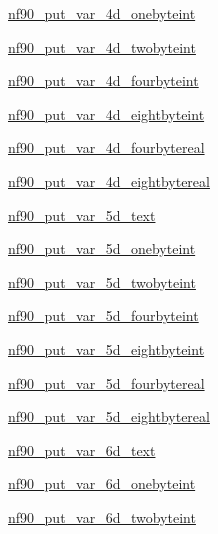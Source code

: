 \begin{DoxyCompactItemize}
\item 
\hyperlink{interfacenf90__put__var_afef8b619560b0aeb3b678a9d251a52c8}{nf90\+\_\+put\+\_\+var\+\_\+4d\+\_\+onebyteint}
\item 
\hyperlink{interfacenf90__put__var_ac772502ffbe8fab1bfe007d11a830746}{nf90\+\_\+put\+\_\+var\+\_\+4d\+\_\+twobyteint}
\item 
\hyperlink{interfacenf90__put__var_aac9f33a2d67a4df5e1e4a909ddd499b8}{nf90\+\_\+put\+\_\+var\+\_\+4d\+\_\+fourbyteint}
\item 
\hyperlink{interfacenf90__put__var_ae6f024d633a1bd897e52e8ebe5a22cc8}{nf90\+\_\+put\+\_\+var\+\_\+4d\+\_\+eightbyteint}
\item 
\hyperlink{interfacenf90__put__var_a6527c4495640fe498d397936c8f475e1}{nf90\+\_\+put\+\_\+var\+\_\+4d\+\_\+fourbytereal}
\item 
\hyperlink{interfacenf90__put__var_a1720fee6ed56ced0f889e96b69acccc9}{nf90\+\_\+put\+\_\+var\+\_\+4d\+\_\+eightbytereal}
\item 
\hyperlink{interfacenf90__put__var_a74c7bfd3ee53a05a63e210bb318f2dd1}{nf90\+\_\+put\+\_\+var\+\_\+5d\+\_\+text}
\item 
\hyperlink{interfacenf90__put__var_af4799e8f8cb572b39cc0b6300c166eaf}{nf90\+\_\+put\+\_\+var\+\_\+5d\+\_\+onebyteint}
\item 
\hyperlink{interfacenf90__put__var_ac7ffad7cae7b32412c51c272eb0f556a}{nf90\+\_\+put\+\_\+var\+\_\+5d\+\_\+twobyteint}
\item 
\hyperlink{interfacenf90__put__var_a24ac2847fdc516c2337214e1b9fa0a17}{nf90\+\_\+put\+\_\+var\+\_\+5d\+\_\+fourbyteint}
\item 
\hyperlink{interfacenf90__put__var_a68064bd88d8d7ac454eb9715ccae7818}{nf90\+\_\+put\+\_\+var\+\_\+5d\+\_\+eightbyteint}
\item 
\hyperlink{interfacenf90__put__var_af3a0ee1a10cd9a6cf14b0d95408061f8}{nf90\+\_\+put\+\_\+var\+\_\+5d\+\_\+fourbytereal}
\item 
\hyperlink{interfacenf90__put__var_aacd729204a939624d7aa773a4baf7f19}{nf90\+\_\+put\+\_\+var\+\_\+5d\+\_\+eightbytereal}
\item 
\hyperlink{interfacenf90__put__var_a99252455811e0f98f8fc062974f6ff53}{nf90\+\_\+put\+\_\+var\+\_\+6d\+\_\+text}
\item 
\hyperlink{interfacenf90__put__var_a21384ee98d9a345176c4f58f941c29f0}{nf90\+\_\+put\+\_\+var\+\_\+6d\+\_\+onebyteint}
\item 
\hyperlink{interfacenf90__put__var_a07a5baf811cb9dafbf2e9c64968256c9}{nf90\+\_\+put\+\_\+var\+\_\+6d\+\_\+twobyteint}

\end{DoxyCompactItemize}

